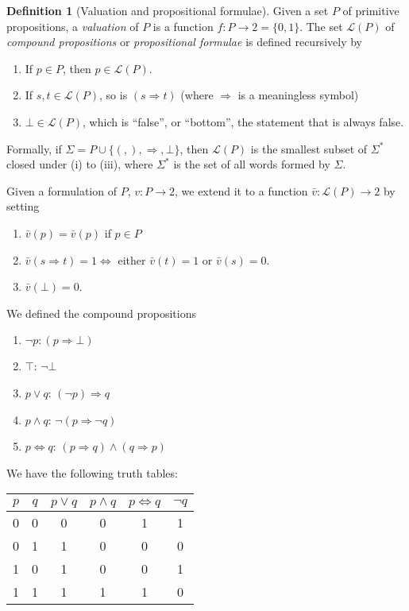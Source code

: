 \documentclass[a4paper]{article}
\theoremstyle{definition}
\newtheorem*{defi}{Definition}
\newcommand{\La}{\mathcal{L}}
\begin{document}
\begin{defi}[Valuation and propositional formulae]
  Given a set $P$ of primitive propositions, a \emph{valuation} of $P$ is a function $f:P \to 2 = \{0, 1\}$. The set $\La(P)$ of \emph{compound propositions} or \emph{propositional formulae} is defined recursively by
  \begin{enumerate}
  \item If $p\in P$, then $p\in \La(P)$.
  \item If $s, t\in \La(P)$, so is $(s\Rightarrow t)$ (where $\Rightarrow$ is a meaningless symbol)
  \item $\bot \in \La(P)$, which is ``false'', or ``bottom'', the statement that is always false.
  \end{enumerate}

  Formally, if $\Sigma = P\cup \{(, ), \Rightarrow, \bot\}$, then $\La(P)$ is the smallest subset of $\Sigma^*$ closed under (i) to (iii), where $\Sigma^*$ is the set of all words formed by $\Sigma$.

  Given a formulation of $P$, $v: P\to 2$, we extend it to a function $\bar v: \La(P)\to 2$ by setting
  \begin{enumerate}
  \item $\bar v(p) = \bar v(p)$ if $p\in P$
  \item $\bar v(s\Rightarrow t) = 1 \Leftrightarrow$ either $\bar v(t) = 1$ or $\bar v(s) = 0$.
  \item $\bar v(\bot) = 0$.
  \end{enumerate}

  We defined the compound propositions
  \begin{enumerate}
  \item $\neg p: (p\Rightarrow \bot)$
  \item $\top$: $\neg \bot$
  \item $p\vee q$: $(\neg p)\Rightarrow q$
  \item $p\wedge q$: $\neg(p\Rightarrow \neg q)$
  \item $p\Leftrightarrow q$: $(p\Rightarrow q)\wedge (q\Rightarrow p)$
  \end{enumerate}

  We have the following truth tables:\\
  \begin{tabular}{cc|cccc}
    $p$ & $q$ & $p\vee q$ & $p\wedge q$ & $p\Leftrightarrow q$ & $\neg q$\\\hline
    0 & 0 & 0 & 0 & 1 & 1\\
    0 & 1 & 1 & 0 & 0 & 0\\
    1 & 0 & 1 & 0 & 0 & 1\\
    1 & 1 & 1 & 1 & 1 & 0
  \end{tabular}
\end{defi}
\end{document}
